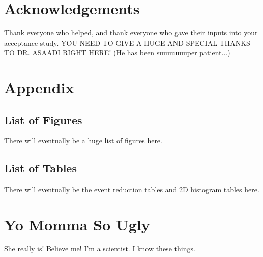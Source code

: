 \documentclass[11pt]{article}
\begin{document}
\section{Acknowledgements}
Thank everyone who helped, and thank everyone who gave their inputs into your acceptance study. YOU NEED TO GIVE A HUGE AND SPECIAL THANKS TO DR. ASAADI RIGHT HERE! (He has been suuuuuuuper patient...)



\section{Appendix}
\subsection{List of Figures}
There will eventually be a huge list of figures here.

\subsection{List of Tables}
There will eventually be the event reduction tables and 2D histogram tables here.



\section{Yo Momma So Ugly}
She really is! Believe me! I'm a scientist. I know these things.
\end{document}
